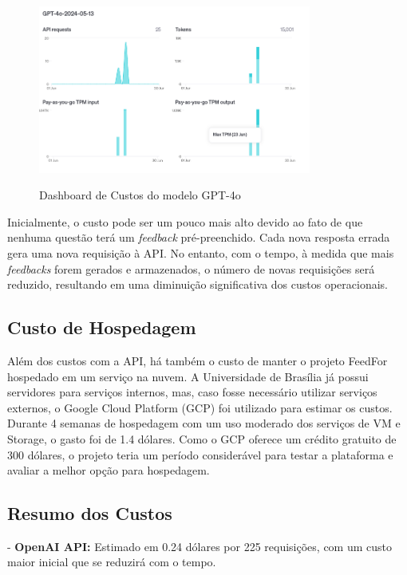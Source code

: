 \begin{figure}[H]
    \centering
    \caption{Dashboard de Custos do modelo GPT-4o}
    \includegraphics[width=0.8\textwidth]{figuras/cost_gpt_4o.png}
    \label{fig:first_phase}
\end{figure}

Inicialmente, o custo pode ser um pouco mais alto devido ao fato de que nenhuma questão terá um \textit{feedback} pré-preenchido. Cada nova resposta errada gera uma nova requisição à API. No entanto, com o tempo, à medida que mais \textit{feedbacks} forem gerados e armazenados, o número de novas requisições será reduzido, resultando em uma diminuição significativa dos custos operacionais.

\subsection{Custo de Hospedagem}

Além dos custos com a API, há também o custo de manter o projeto FeedFor hospedado em um serviço na nuvem. A Universidade de Brasília já possui servidores para serviços internos, mas, caso fosse necessário utilizar serviços externos, o Google Cloud Platform (GCP) foi utilizado para estimar os custos. Durante 4 semanas de hospedagem com um uso moderado dos serviços de VM e Storage, o gasto foi de 1.4 dólares. Como o GCP oferece um crédito gratuito de 300 dólares, o projeto teria um período considerável para testar a plataforma e avaliar a melhor opção para hospedagem.

\subsection{Resumo dos Custos}

- \textbf{OpenAI API:} Estimado em 0.24 dólares por 225 requisições, com um custo maior inicial que se reduzirá com o tempo.


